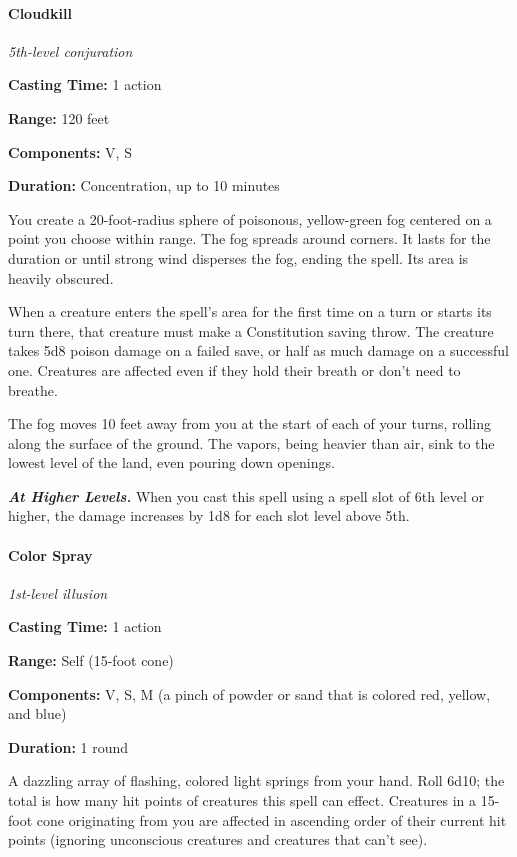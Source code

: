\documentclass[
]{article}
\begin{document}
\hypertarget{cloudkill}{%
\paragraph{Cloudkill}\label{cloudkill}}

\emph{5th-level conjuration}

\textbf{Casting Time:} 1 action

\textbf{Range:} 120 feet

\textbf{Components:} V, S

\textbf{Duration:} Concentration, up to 10 minutes

You create a 20-foot-radius sphere of poisonous, yellow-green fog
centered on a point you choose within range. The fog spreads around
corners. It lasts for the duration or until strong wind disperses the
fog, ending the spell. Its area is heavily obscured.

When a creature enters the spell's area for the first time on a turn or
starts its turn there, that creature must make a Constitution saving
throw. The creature takes 5d8 poison damage on a failed save, or half as
much damage on a successful one. Creatures are affected even if they
hold their breath or don't need to breathe.

The fog moves 10 feet away from you at the start of each of your turns,
rolling along the surface of the ground. The vapors, being heavier than
air, sink to the lowest level of the land, even pouring down openings.

\emph{\textbf{At Higher Levels.}} When you cast this spell using a spell
slot of 6th level or higher, the damage increases by 1d8 for each slot
level above 5th.

\hypertarget{color-spray}{%
\paragraph{Color Spray}\label{color-spray}}

\emph{1st-level illusion}

\textbf{Casting Time:} 1 action

\textbf{Range:} Self (15-foot cone)

\textbf{Components:} V, S, M (a pinch of powder or sand that is colored
red, yellow, and blue)

\textbf{Duration:} 1 round

A dazzling array of flashing, colored light springs from your hand. Roll
6d10; the total is how many hit points of creatures this spell can
effect. Creatures in a 15-foot cone originating from you are affected in
ascending order of their current hit points (ignoring unconscious
creatures and creatures that can't see).
\end{document}
